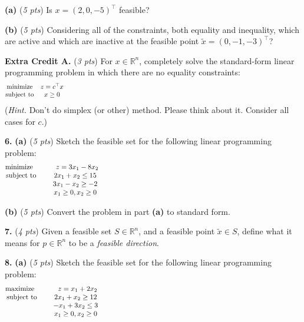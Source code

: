 \documentclass[11pt]{amsart}
\newcommand{\RR}{{\mathbb{R}}}
\newcommand{\prob}[1]{\bigskip\noindent\textbf{#1.} }
\newcommand{\pts}[1]{(\emph{#1 pts})}
\newcommand{\probpts}[2]{\prob{#1} \pts{#2}}
\newcommand{\epartpts}[2]{\medskip\noindent \textbf{(#1)} \pts{#2}}
\begin{document}
\epartpts{a}{5}  Is $x=(2,0,-5)^\top$ feasible?
\vfill


\epartpts{b}{5}  Considering all of the constraints, both equality and inequality, which are active and which are inactive at the feasible point $\tilde x=(0,-1,-3)^\top$?
\vfill


\probpts{Extra Credit A}{3}  For $x\in\RR^n$, completely solve the standard-form linear programming problem in which there are no equality constraints:
    $$\begin{matrix}
    \text{minimize}   & z = c^\top x\\
    \text{subject to} & x \ge 0
    \end{matrix} \hspace{5.0in}$$
(\emph{Hint.}  Don't do simplex (or other) method.  Please think about it.  Consider all cases for $c$.)
\vspace{2.5in}


\clearpage\newpage
\prob{6} \epartpts{a}{5}  Sketch the feasible set for the following linear programming problem:
    $$\begin{matrix}
    \text{minimize}\phantom{xxx} & \phantom{x}z = 3 x_1 - 8 x_2 \\
    \text{subject to}\phantom{xx} & 2 x_1 + x_2 \le 15 \\
                      & 3 x_1 - x_2 \ge -2 \\
                      & x_1 \ge 0, x_2 \ge 0
    \end{matrix} \hspace{4.0in}$$
\vfill

\epartpts{b}{5}  Convert the problem in part \textbf{(a)} to standard form.
\vfill

\probpts{7}{4}  Given a feasible set $S\in \RR^n$, and a feasible point $\tilde x \in S$, define what it means for $p\in\RR^n$ to be a \emph{feasible direction}.
\vfill


\clearpage\newpage
\prob{8} \epartpts{a}{5}  Sketch the feasible set for the following linear programming problem:
    $$\begin{matrix}
    \text{maximize}\phantom{xxx} & \phantom{x}z = x_1 + 2 x_2 \\
    \text{subject to}\phantom{xx} & 2 x_1 + x_2 \ge 12 \\
                      & - x_1 + 3 x_2 \le 3 \\
                      & x_1 \ge 0, x_2 \ge 0
    \end{matrix} \hspace{4.0in}$$
\vfill
\end{document}
